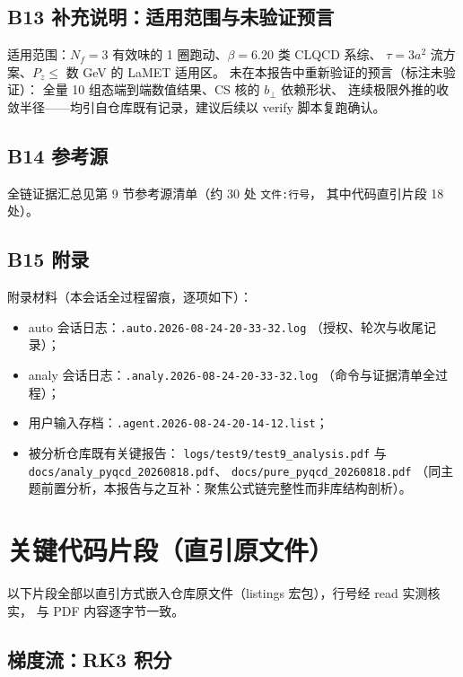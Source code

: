 \documentclass[UTF8]{ctexart}
\begin{document}
\subsection{B13 补充说明：适用范围与未验证预言}
适用范围：$N_f=3$ 有效味的 1 圈跑动、$\beta=6.20$ 类 CLQCD 系综、
$\tau=3a^2$ 流方案、$P_z\le$ 数 GeV 的 LaMET 适用区。
未在本报告中重新验证的预言（标注\textcolor{warn}{未验证}）：
全量 10 组态端到端数值结果、CS 核的 $b_\perp$ 依赖形状、
连续极限外推的收敛半径——均引自仓库既有记录，建议后续以 verify 脚本复跑确认。

\subsection{B14 参考源}
全链证据汇总见第 9 节参考源清单（约 30 处 \texttt{文件:行号}，
其中代码直引片段 18 处）。

\subsection{B15 附录}
附录材料（本会话全过程留痕，逐项如下）：
\begin{itemize}
\item auto 会话日志：\texttt{\nolinkurl{.auto.2026-08-24-20-33-32.log}}
（授权、轮次与收尾记录）；
\item analy 会话日志：\texttt{\nolinkurl{.analy.2026-08-24-20-33-32.log}}
（命令与证据清单全过程）；
\item 用户输入存档：\texttt{\nolinkurl{.agent.2026-08-24-20-14-12.list}}；
\item 被分析仓库既有关键报告：
\texttt{\nolinkurl{logs/test9/test9_analysis.pdf}} 与
\texttt{\nolinkurl{docs/analy_pyqcd_20260818.pdf}}、
\texttt{\nolinkurl{docs/pure_pyqcd_20260818.pdf}}
（同主题前置分析，本报告与之互补：聚焦公式链完整性而非库结构剖析）。
\end{itemize}

\section{关键代码片段（直引原文件）}

以下片段全部以直引方式嵌入仓库原文件（listings 宏包），行号经 read 实测核实，
与 PDF 内容逐字节一致。

\subsection{梯度流：RK3 积分}

\end{document}
